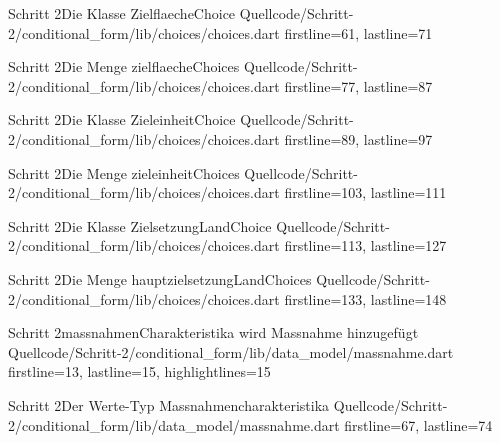 \begin{alexlistingzwei}{Schritt 2}{Die Klasse ZielflaecheChoice}
  {Quellcode/Schritt-2/conditional_form/lib/choices/choices.dart}
  {firstline=61, lastline=71}
  \label{lst:Schritt2KlasseZielflaecheChoice}
\end{alexlistingzwei}

\begin{alexlistingzwei}{Schritt 2}{Die Menge zielflaecheChoices}
  {Quellcode/Schritt-2/conditional_form/lib/choices/choices.dart}
  {firstline=77, lastline=87}
  \label{lst:Schritt2DieMengeZielflaecheChoices}
\end{alexlistingzwei}

\begin{alexlistingzwei}{Schritt 2}{Die Klasse ZieleinheitChoice}
  {Quellcode/Schritt-2/conditional_form/lib/choices/choices.dart}
  {firstline=89, lastline=97}
  \label{lst:Schritt2KlasseZieleinheitChoice}
\end{alexlistingzwei}

\begin{alexlistingzwei}{Schritt 2}{Die Menge zieleinheitChoices}
  {Quellcode/Schritt-2/conditional_form/lib/choices/choices.dart}
  {firstline=103, lastline=111}
  \label{lst:Schritt2DieMengeZieleinheitChoices}
\end{alexlistingzwei}


\begin{alexlistingzwei}{Schritt 2}{Die Klasse ZielsetzungLandChoice}
  {Quellcode/Schritt-2/conditional_form/lib/choices/choices.dart}
  {firstline=113, lastline=127}
  \label{lst:Schritt2KlasseZielsetzungLandChoice}
\end{alexlistingzwei}

\begin{alexlistingzwei}{Schritt 2}{Die Menge hauptzielsetzungLandChoices}
  {Quellcode/Schritt-2/conditional_form/lib/choices/choices.dart}
  {firstline=133, lastline=148}
  \label{lst:Schritt2DieMengeHauptzielsetzungLandChoices}
\end{alexlistingzwei}


\begin{alexlistingzwei}{Schritt 2}{massnahmenCharakteristika wird Massnahme hinzugefügt}
  {Quellcode/Schritt-2/conditional_form/lib/data_model/massnahme.dart}
  {firstline=13, lastline=15, highlightlines={15}}
  \label{lst:Schritt2massnahmenCharakteristika wird Massnahme hinzugefügt}
\end{alexlistingzwei}


\begin{alexlistingzwei}{Schritt 2}{Der Werte-Typ Massnahmencharakteristika}
  {Quellcode/Schritt-2/conditional_form/lib/data_model/massnahme.dart}
  {firstline=67, lastline=74}
  \label{lst:Schritt2WerteTypMassnahmencharakteristika}
\end{alexlistingzwei}


